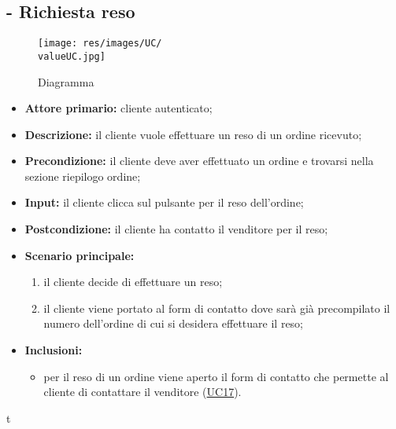 \subsection{ - Richiesta reso}
\begin{figure}[H]
    \centering
    \texttt{[image: res/images/UC/\\valueUC.jpg]}
    \caption{Diagramma }
\end{figure}
\begin{itemize}
    \item \textbf{Attore primario:} cliente autenticato;
    \item \textbf{Descrizione:} il cliente vuole effettuare un reso di un ordine ricevuto;
    \item \textbf{Precondizione:}  il cliente deve aver effettuato un ordine e trovarsi nella sezione riepilogo ordine;
    \item \textbf{Input:} il cliente clicca sul pulsante per il reso dell'ordine;
    \item \textbf{Postcondizione:} il cliente ha contatto il venditore per il reso;
    \item \textbf{Scenario principale:}
          \begin{enumerate}
              \item il cliente decide di effettuare un reso;
              \item il cliente viene portato al form di contatto dove sarà già precompilato il numero dell'ordine di cui si desidera effettuare il reso;
          \end{enumerate}
    \item \textbf{Inclusioni:}
          \begin{itemize}
              \item per il reso di un ordine viene aperto il form di contatto che permette al cliente di contattare il venditore (\hyperref[UC17]{UC17}).
          \end{itemize}
\end{itemize}t

\stepUserCase

